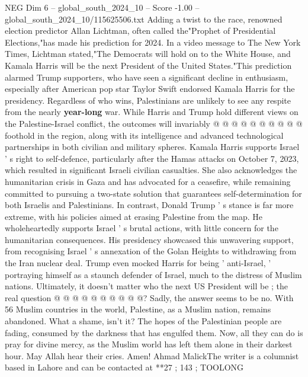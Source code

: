 \begin{textsample}{NEG Dim 6 – global\_south\_2024\_10 – Score -1.00 – global\_south\_2024\_10/115625506.txt}
Adding a twist to the race, renowned election predictor Allan Lichtman, often called the"Prophet of Presidential Elections,"has made his prediction for 2024.
In a video message to The New York Times, Lichtman stated,"The Democrats will hold on to the White House, and Kamala Harris will be the next President of the United States."This prediction alarmed Trump supporters, who have seen a significant decline in enthusiasm, especially after American pop star Taylor Swift endorsed Kamala Harris for the presidency.
Regardless of who wins, Palestinians are unlikely to see any respite from the nearly \textbf{year-long} war.
While Harris and Trump hold different views on the Palestine-Israel conflict, the outcomes will invariably @ @ @ @ @ @ @ @ @ @ foothold in the region, along with its intelligence and advanced technological partnerships in both civilian and military spheres.
Kamala Harris supports Israel ' s right to self-defence, particularly after the Hamas attacks on October 7, 2023, which resulted in significant Israeli civilian casualties.
She also acknowledges the humanitarian crisis in Gaza and has advocated for a ceasefire, while remaining committed to pursuing a two-state solution that guarantees self-determination for both Israelis and Palestinians.
In contrast, Donald Trump ' s stance is far more extreme, with his policies aimed at erasing Palestine from the map.
He wholeheartedly supports Israel ' s brutal actions, with little concern for the humanitarian consequences.
His presidency showcased this unwavering support, from recognising Israel ' s annexation of the Golan Heights to withdrawing from the Iran nuclear deal.
Trump even mocked Harris for being ' anti-Israel, ' portraying himself as a staunch defender of Israel, much to the distress of Muslim nations.
Ultimately, it doesn't matter who the next US President will be ; the real question @ @ @ @ @ @ @ @ @ @?
Sadly, the answer seems to be no.
With 56 Muslim countries in the world, Palestine, as a Muslim nation, remains abandoned.
What a shame, isn't it?
The hopes of the Palestinian people are fading, consumed by the darkness that has engulfed them.
Now, all they can do is pray for divine mercy, as the Muslim world has left them alone in their darkest hour.
May Allah hear their cries.
Amen!
Ahmad MalickThe writer is a columnist based in Lahore and can be contacted at **27 ; 143 ; TOOLONG

\end{textsample}
